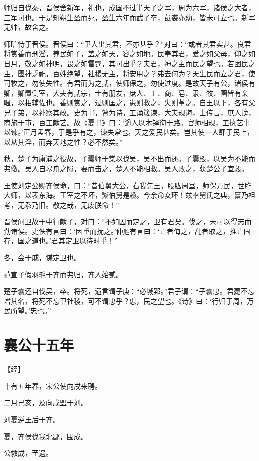 \documentclass[a4paper,12pt,UTF8,twoside]{ctexbook}
\begin{document}
师归自伐秦，晋侯舍新军，礼也，成国不过半天子之军，周为六军，诸侯之大者，三军可也。于是知朔生盈而死，盈生六年而武子卒，彘裘亦幼，皆未可立也。新军无帅，故舍之。

师旷恃于晋侯。晋侯曰：“卫人出其君，不亦甚乎？”对曰：“或者其君实甚。良君将赏善而刑淫，养民如子，盖之如天，容之如地。民奉其君，爱之如父母，仰之如日月，敬之如神明，畏之如雷霆，其可出乎？夫君，神之主而民之望也。若困民之主，匮神乏祀，百姓绝望，社稷无主，将安用之？弗去何为？天生民而立之君，使司牧之，勿使失性。有君而为之贰，使师保之，勿使过度。是故天子有公，诸侯有卿，卿置侧室，大夫有贰宗，士有朋友，庶人、工、商、皂、隶、牧、圉皆有亲暱，以相辅佐也。善则赏之，过则匡之，患则救之，失则革之。自王以下，各有父兄子弟，以补察其政。史为书，瞽为诗，工诵箴谏，大夫规诲，士传言，庶人谤，商旅于市，百工献艺。故《夏书》曰：‘遒人以木铎徇于路。官师相规，工执艺事以谏。’正月孟春，于是乎有之，谏失常也。天之爱民甚矣。岂其使一人肆于民上，以从其淫，而弃天地之性？必不然矣。”

秋，楚子为庸浦之役故，子囊师于棠以伐吴，吴不出而还。子囊殿，以吴为不能而弗儆。吴人自皋舟之隘，要而击之，楚人不能相救。吴人败之，获楚公子宜穀。

王使刘定公赐齐侯命，曰：“昔伯舅大公，右我先王，股肱周室，师保万民，世胙大师，以表东海。王室之不坏，繄伯舅是赖。今余命女环！兹率舅氏之典，纂乃祖考，无忝乃旧。敬之哉，无废朕命！”

晋侯问卫故于中行献子，对曰：“不如因而定之，卫有君矣。伐之，未可以得志而勤诸侯。史佚有言曰：‘因重而抚之。’仲虺有言曰：‘亡者侮之，乱者取之，推亡固存，国之道也。’君其定卫以待时乎！”



冬，会于戚，谋定卫也。

范宣子假羽毛于齐而弗归，齐人始贰。

楚子囊还自伐吴，卒。将死，遗言谓子庚：“必城郢。”君子谓：“子囊忠。君薨不忘增其名，将死不忘卫社稷，可不谓忠乎？忠，民之望也。《诗》曰：‘行归于周，万民所望。’忠也。”

\section{襄公十五年}



【经】

十有五年春，宋公使向戌来聘。

二月己亥，及向戌盟于刘。

刘夏逆王后于齐。

夏，齐侯伐我北鄙，围成。

公救成，至遇。
\end{document}
